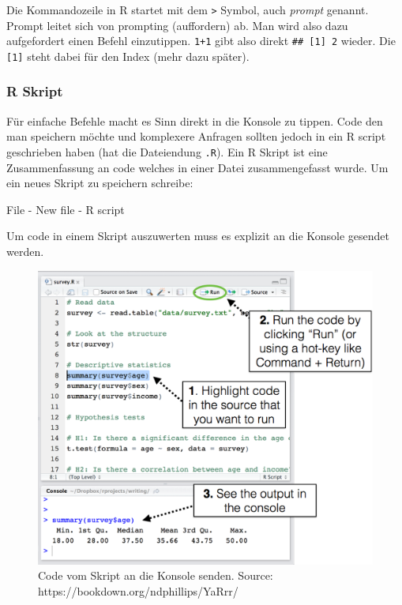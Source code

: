 \documentclass[
]{article}
\begin{document}
Die Kommandozeile in R startet mit dem \texttt{\textgreater{}} Symbol, auch \emph{prompt} genannt. Prompt leitet sich von prompting (auffordern) ab. Man wird also dazu aufgefordert einen Befehl einzutippen. \texttt{1+1} gibt also direkt \texttt{\#\#\ {[}1{]}\ 2} wieder. Die \texttt{{[}1{]}} steht dabei für den Index (mehr dazu später).

\hypertarget{r-skript}{%
\subsubsection{R Skript}\label{r-skript}}

Für einfache Befehle macht es Sinn direkt in die Konsole zu tippen. Code den man speichern möchte und komplexere Anfragen sollten jedoch in ein R script geschrieben haben (hat die Dateiendung \texttt{.R}). Ein R Skript ist eine Zusammenfassung an code welches in einer Datei zusammengefasst wurde.
Um ein neues Skript zu speichern schreibe:

File - New file - R script

Um code in einem Skript auszuwerten muss es explizit an die Konsole gesendet werden.

\begin{figure}

{\centering \includegraphics[width=1\linewidth]{images/014} 

}

\caption{Code vom Skript an die Konsole senden. Source: https://bookdown.org/ndphillips/YaRrr/}\label{fig:unnamed-chunk-22}
\end{figure}
\end{document}
